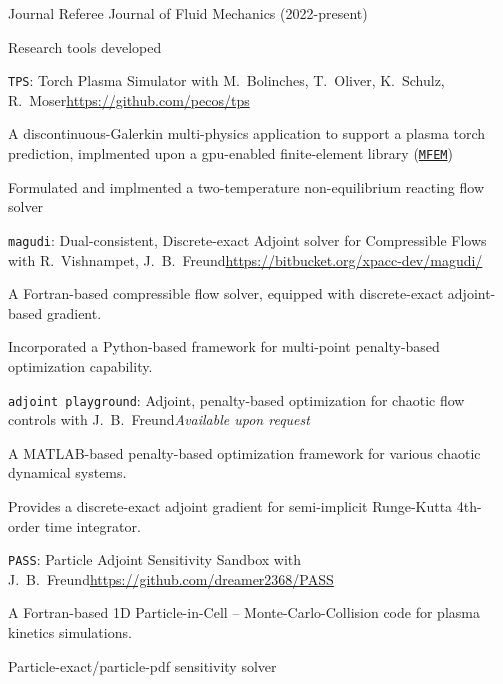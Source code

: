 \documentclass{resume} %
\begin{document}
\begin{rSection}{Journal Referee}
Journal of Fluid Mechanics (2022-present)
\end{rSection}


\begin{rSection}{Research tools developed}
\begin{rSubsection}{\texttt{TPS}: Torch Plasma Simulator}{}
{with M.\ Bolinches, T.\ Oliver, K.\ Schulz, R.\ Moser}{\url{https://github.com/pecos/tps}}
\item A discontinuous-Galerkin multi-physics application to support a plasma torch prediction,
implmented upon a gpu-enabled finite-element library (\href{https://mfem.org}{\texttt{MFEM}})
\item Formulated and implmented a two-temperature non-equilibrium reacting flow solver
\end{rSubsection}
\begin{rSubsection}{\texttt{magudi}: Dual-consistent, Discrete-exact Adjoint solver for Compressible Flows}{}
{with R.\ Vishnampet, J.\ B.\ Freund}{\url{https://bitbucket.org/xpacc-dev/magudi/}}
\item A Fortran-based compressible flow solver, equipped with discrete-exact adjoint-based gradient.
\item Incorporated a Python-based framework for multi-point penalty-based optimization capability.
\end{rSubsection}
\begin{rSubsection}{\texttt{adjoint playground}: Adjoint, penalty-based optimization for chaotic flow controls}{}
{with J.\ B.\ Freund}{\em Available upon request}
\item A MATLAB-based penalty-based optimization framework for various chaotic dynamical systems.
\item Provides a discrete-exact adjoint gradient for semi-implicit Runge-Kutta 4th-order time integrator.
\end{rSubsection}
\begin{rSubsection}{\texttt{PASS}: Particle Adjoint Sensitivity Sandbox}{}
{with J.\ B.\ Freund}{\url{https://github.com/dreamer2368/PASS}}
\item A Fortran-based 1D Particle-in-Cell -- Monte-Carlo-Collision code for plasma kinetics simulations.
\item Particle-exact/particle-pdf sensitivity solver
\end{rSubsection}
\end{rSection}
\clearpage
\end{document}
